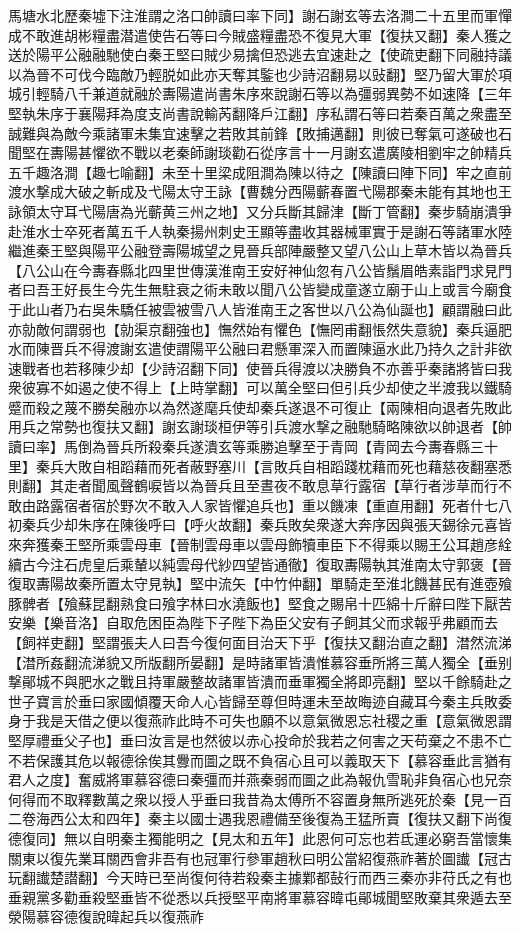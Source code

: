 馬塘水北歷秦墟下注淮謂之洛口帥讀曰率下同】謝石謝玄等去洛澗二十五里而軍憚成不敢進胡彬糧盡潜遣使告石等曰今賊盛糧盡恐不復見大軍【復扶又翻】秦人獲之送於陽平公融融馳使白秦王堅曰賊少易擒但恐逃去宜速赴之【使疏吏翻下同融持議以為晉不可伐今臨敵乃輕脱如此亦天奪其鍳也少詩沼翻易以䜴翻】堅乃留大軍於項城引輕騎八千兼道就融於夀陽遣尚書朱序來說謝石等以為彊弱異勢不如速降【三年堅執朱序于襄陽拜為度支尚書說輸芮翻降戶江翻】序私謂石等曰若秦百萬之衆盡至誠難與為敵今乘諸軍未集宜速擊之若敗其前鋒【敗捕邁翻】則彼已奪氣可遂破也石聞堅在夀陽甚懼欲不戰以老秦師謝琰勸石從序言十一月謝玄遣廣陵相劉牢之帥精兵五千趣洛澗【趣七喻翻】未至十里梁成阻澗為陳以待之【陳讀曰陣下同】牢之直前渡水撃成大破之斬成及弋陽太守王詠【曹魏分西陽蘄春置弋陽郡秦未能有其地也王詠領太守耳弋陽唐為光蘄黄三州之地】又分兵斷其歸津【斷丁管翻】秦步騎崩潰爭赴淮水士卒死者萬五千人執秦揚州刺史王顯等盡收其器械軍實于是謝石等諸軍水陸繼進秦王堅與陽平公融登壽陽城望之見晉兵部陣嚴整又望八公山上草木皆以為晉兵【八公山在今夀春縣北四里世傳漢淮南王安好神仙忽有八公皆鬚眉皓素詣門求見門者曰吾王好長生今先生無駐衰之術未敢以聞八公皆變成童遂立廟于山上或言今廟食于此山者乃右吳朱驕任被雲被雪八人皆淮南王之客世以八公為仙誕也】顧謂融曰此亦勍敵何謂弱也【勍渠京翻強也】憮然始有懼色【憮罔甫翻悵然失意貌】秦兵逼肥水而陳晋兵不得渡謝玄遣使謂陽平公融曰君懸軍深入而置陳逼水此乃持久之計非欲速戰者也若移陳少却【少詩沼翻下同】使晉兵得渡以决勝負不亦善乎秦諸將皆曰我衆彼寡不如遏之使不得上【上時掌翻】可以萬全堅曰但引兵少却使之半渡我以鐵騎蹙而殺之蔑不勝矣融亦以為然遂麾兵使却秦兵遂退不可復止【兩陳相向退者先敗此用兵之常勢也復扶又翻】謝玄謝琰桓伊等引兵渡水撃之融馳騎略陳欲以帥退者【帥讀曰率】馬倒為晉兵所殺秦兵遂潰玄等乘勝追擊至于青岡【青岡去今夀春縣三十里】秦兵大敗自相蹈藉而死者蔽野塞川【言敗兵自相蹈踐枕藉而死也藉慈夜翻塞悉則翻】其走者聞風聲鶴唳皆以為晉兵且至晝夜不敢息草行露宿【草行者涉草而行不敢由路露宿者宿於野次不敢入人家皆懼追兵也】重以饑凍【重直用翻】死者什七八初秦兵少却朱序在陳後呼曰【呼火故翻】秦兵敗矣衆遂大奔序因與張天錫徐元喜皆來奔獲秦王堅所乘雲母車【晉制雲母車以雲母飾犢車臣下不得乘以賜王公耳趙彦絟續古今注石虎皇后乘輦以純雲母代紗四望皆通徹】復取夀陽執其淮南太守郭褒【晉復取夀陽故秦所置太守見執】堅中流矢【中竹仲翻】單騎走至淮北饑甚民有進壺飱豚髀者【飱蘇昆翻熟食曰飱字林曰水澆飯也】堅食之賜帛十匹綿十斤辭曰陛下厭苦安樂【樂音洛】自取危困臣為陛下子陛下為臣父安有子飼其父而求報乎弗顧而去【飼祥吏翻】堅謂張夫人曰吾今復何面目治天下乎【復扶又翻治直之翻】澘然流涕【澘所姦翻流涕貌又所版翻所晏翻】是時諸軍皆潰惟慕容垂所將三萬人獨全【垂别撃鄖城不與肥水之戰且持軍嚴整故諸軍皆潰而垂軍獨全將即亮翻】堅以千餘騎赴之世子寶言於垂曰家國傾覆天命人心皆歸至尊但時運未至故晦迹自藏耳今秦主兵敗委身于我是天借之便以復燕祚此時不可失也願不以意氣微恩忘社稷之重【意氣微恩謂堅厚禮垂父子也】垂曰汝言是也然彼以赤心投命於我若之何害之天苟棄之不患不亡不若保護其危以報德徐俟其釁而圖之既不負宿心且可以義取天下【慕容垂此言猶有君人之度】奮威將軍慕容德曰秦彊而并燕秦弱而圖之此為報仇雪恥非負宿心也兄奈何得而不取釋數萬之衆以授人乎垂曰我昔為太傅所不容置身無所逃死於秦【見一百二卷海西公太和四年】秦主以國士遇我恩禮備至後復為王猛所賣【復扶又翻下尚復德復同】無以自明秦主獨能明之【見太和五年】此恩何可忘也若氐運必窮吾當懷集關東以復先業耳關西會非吾有也冠軍行參軍趙秋曰明公當紹復燕祚著於圖䜟【冠古玩翻䜟楚譛翻】今天時已至尚復何待若殺秦主據鄴都鼔行而西三秦亦非苻氏之有也垂親黨多勸垂殺堅垂皆不從悉以兵授堅平南將軍慕容暐屯鄖城聞堅敗棄其衆遁去至滎陽慕容德復說暐起兵以復燕祚